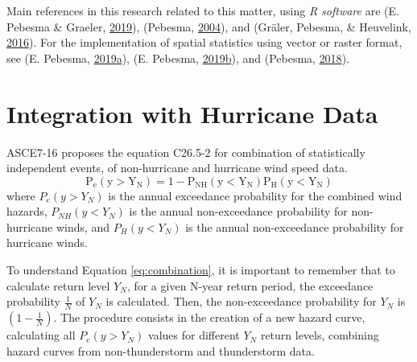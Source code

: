 \documentclass[12pt,twoside]{reedthesis}
\begin{document}
Main references in this research related to this matter, using \emph{R software} are (E. Pebesma \& Graeler, \protect\hyperlink{ref-Pebesma2019}{2019}), (Pebesma, \protect\hyperlink{ref-Pebesma2004}{2004}), and (Gräler, Pebesma, \& Heuvelink, \protect\hyperlink{ref-Graeler2016}{2016}). For the implementation of spatial statistics using vector or raster format, see (E. Pebesma, \protect\hyperlink{ref-Pebesma2019a}{2019}\protect\hyperlink{ref-Pebesma2019a}{a}), (E. Pebesma, \protect\hyperlink{ref-Pebesma2019b}{2019}\protect\hyperlink{ref-Pebesma2019b}{b}), and (Pebesma, \protect\hyperlink{ref-Pebesma2018}{2018}).

\hypertarget{integration}{%
\section{Integration with Hurricane Data}\label{integration}}

ASCE7-16 proposes the equation C26.5-2 for combination of statistically independent events, of non-hurricane and hurricane wind speed data.
\begin{equation}
  \mathrm{
          P_e(y>Y_N) = 1 - P_{NH}(y<Y_N)P_{H}(y<Y_N)
        }
  \label{eq:combination}
\end{equation}
where \(P_e(y>Y_N)\) is the annual exceedance probability for the combined wind hazards, \(P_{NH}(y<Y_N)\) is the annual non-exceedance probability for non-hurricane winds, and \(P_{H}(y<Y_N)\) is the annual non-exceedance probability for hurricane winds.

To understand Equation \eqref{eq:combination}, it is important to remember that to calculate return level \(Y_N\), for a given N-year return period, the exceedance probability \(\frac{1}{N}\) of \(Y_N\) is calculated. Then, the non-exceedance probability for \(Y_N\) is \(\left(1-\frac{1}{N}\right)\). The procedure consists in the creation of a new hazard curve, calculating all \(P_e(y>Y_N)\) values for different \(Y_N\) return levels, combining hazard curves from non-thunderstorm and thunderstorm data.
\end{document}
